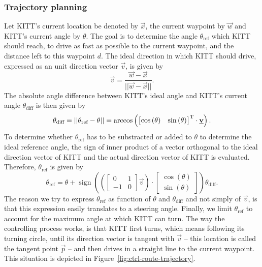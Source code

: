 \documentclass[11pt,titlepage]{report}
\begin{document}
\subsubsection{Trajectory planning}
Let KITT's current location be denoted by $\vec{x}$, the current waypoint by $\vec{w}$ and KITT's current angle by $\theta$. The goal is to determine the angle $\theta_{\text{ref}}$ which KITT should reach, to drive as fast as possible to the current waypoint, and the distance left to this waypoint $d$. The ideal direction in which KITT should drive, expressed as an unit direction vector $\vec{v}$, is given by
\[
	\vec{v} = \frac{\vec{w} - \vec{x}}{||\vec{w} - \vec{x}||}.
\]
The absolute angle difference between KITT's ideal angle and KITT's current angle $\theta_{\text{diff}}$ is then given by
\[
	\theta_{\text{diff}} = ||\theta_{\text{ref}} - \theta|| = \operatorname{arccos}\left( \begin{bmatrix}
		\cos{(\theta)} & \sin{(\theta)}
	\end{bmatrix}^{\text T} \cdot \mathbf{\underline{v}} \right).
\]
To determine whether $\theta_{\text{ref}}$ has to be substracted or added to $\theta$ to determine the ideal reference angle, the sign of inner product of a vector orthogonal to the ideal direction vector of KITT and the actual direction vector of KITT is evaluated. Therefore, $\theta_{\text{ref}}$ is given by
\[
	\theta_{\text{ref}} = \theta + \operatorname{sign}\left(\left( \begin{bmatrix}
		0 & 1 \\
		-1 & 0
	\end{bmatrix} \vec{v} \right) \cdot \begin{bmatrix}
		\cos{(\theta)} \\
		\sin{(\theta)}
	\end{bmatrix}\right) \theta_{\text{diff}}.
\]
The reason we try to express $\theta_{\text{ref}}$ as function of $\theta$ and $\theta_{\text{diff}}$ and not simply of $\vec{v}$, is that this expression easily translates to a steering angle. Finally, we limit $\theta_{\text{ref}}$ to account for the maximum angle at which KITT can turn. The way the controlling process works, is that KITT first turns, which means following its turning circle, until its direction vector is tangent with $\vec{v}$ -- this location is called the tangent point $\vec{p}$ -- and then drives in a straight line to the current waypoint. This situation is depicted in Figure~\ref{fig:ctrl-route-trajectory}.
\end{document}
